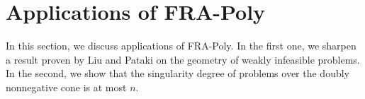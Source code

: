 \documentclass{article}
\newcommand{\reInt}{\mathrm{ri}\,}
\newcommand{\inProd}[2]{\langle #1 , #2 \rangle }
\newcommand{\minFaceD}{ {\mathcal{F}_{\min}^D}}
\newcommand{\stdMap}{ {\mathcal{A}}}
\newcommand{\stdCone}{ {\mathcal{K}}}
\newcommand{\stdFace}{ \mathcal{F}}
\begin{document}
%
%
%







\section{Applications of FRA-Poly}\label{sec:app}
In this section, we discuss applications of FRA-Poly. In the first one, we sharpen 
a result proven by Liu and Pataki \cite{LP17} on the geometry of weakly infeasible problems. 
In the second, we show that the singularity degree of problems over the doubly nonnegative cone 
is at most $n$. 
\end{document}
